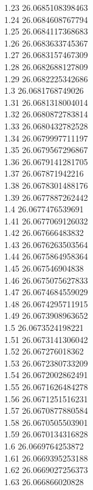 {1.23	26.0685108398463\\
1.24	26.0684608767794\\
1.25	26.0684117368683\\
1.26	26.0683633745367\\
1.27	26.0683157467309\\
1.28	26.0682688127809\\
1.29	26.0682225342686\\
1.3	26.0681768749026\\
1.31	26.0681318004014\\
1.32	26.0680872783814\\
1.33	26.0680432782528\\
1.34	26.0679997711197\\
1.35	26.0679567296867\\
1.36	26.0679141281705\\
1.37	26.067871942216\\
1.38	26.0678301488176\\
1.39	26.0677887262442\\
1.4	26.0677476539691\\
1.41	26.0677069126032\\
1.42	26.067666483832\\
1.43	26.0676263503564\\
1.44	26.0675864958364\\
1.45	26.067546904838\\
1.46	26.0675075627833\\
1.47	26.0674684559029\\
1.48	26.0674295711915\\
1.49	26.0673908963652\\
1.5	26.0673524198221\\
1.51	26.0673141306042\\
1.52	26.067276018362\\
1.53	26.0672380733209\\
1.54	26.0672002862491\\
1.55	26.0671626484278\\
1.56	26.0671251516231\\
1.57	26.0670877880584\\
1.58	26.0670505503901\\
1.59	26.0670134316828\\
1.6	26.0669764253872\\
1.61	26.0669395253188\\
1.62	26.0669027256373\\
1.63	26.066866020828\\
}
